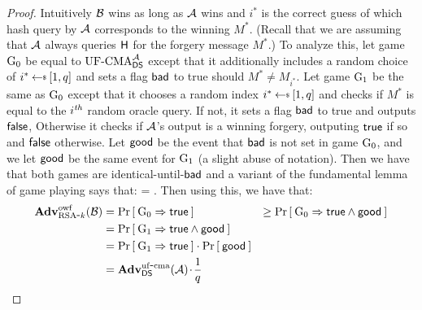 \begin{proof}
Intuitively ${\mathcal B}$ wins as long as ${\mathcal A}$ wins and $i^*$ is the correct guess
of which hash query by ${\mathcal A}$ corresponds to the winning $M^*$. (Recall that we
are assuming that ${\mathcal A}$ always queries $\mathsf{H}$ for the forgery message
$M^*$.) To analyze this, let game ${{\textnormal G}}_0$ be equal to $\textnormal{UF-CMA}_{{\mathsf{DS}}}^{\mathcal A}$ except
that it additionally includes a random choice of $i^* \getsr [1,q]$ and sets a
flag $\mathsf{bad}$ to true should $M^* \ne M_{i^*}$. Let
game ${{\textnormal G}}_1$ be the same as ${{\textnormal G}}_0$ except that  it chooses a random index $i^*
\getsr [1,q]$ and checks if $M^*$ is equal to the $i^{\textit{th}}$ random oracle
query. If not, it sets a flag $\mathsf{bad}$ to true and outputs $\mathsf{false}$, 
Otherwise it checks if ${\mathcal A}$'s output is a winning forgery, outputing
$\mathsf{true}$ if so and $\mathsf{false}$ otherwise. Let $\mathsf{good}$ be the event that $\mathsf{bad}$ is
not set in game ${{\textnormal G}}_0$, and we let $\mathsf{good}$ be the same event for ${{\textnormal G}}_1$ (a
slight abuse of notation). Then we have that both games are
identical-until-$\mathsf{bad}$ and a variant of the fundamental lemma of game playing
says that:
\bnm
  \Prob{\G_0 \Rightarrow\true \land\good} = \Prob{\G_1\Rightarrow\true \land
  \good} \;.
\enm
Then using this, we have that:
\begin{align*}
\mathbf{Adv}^{\mathrm{owf}}_{{\textnormal{RSA}\mbox{-} k}}({\mathcal B}) 
  &= \Pr\left[\: {{\textnormal G}}_0\Rightarrow\mathsf{true} \:\right]
  &\ge \Pr\left[\: {{\textnormal G}}_0\Rightarrow\mathsf{true}\land\mathsf{good} \:\right]\\
  &= \Pr\left[\: {{\textnormal G}}_1\Rightarrow\mathsf{true}\land\mathsf{good} \:\right]\\
  &= \Pr\left[\: {{\textnormal G}}_1\Rightarrow\mathsf{true} \:\right]\cdot\Pr\left[\: \mathsf{good} \:\right]\\
  &= \mathbf{Adv}^{\mathrm{uf\mbox{-} cma}}_{{\mathsf{DS}}}({\mathcal A}){\hspace{-0.1ex}}{\hspace{-0.1ex}}{\hspace{-0.1ex}}\cdot{\hspace{-0.1ex}}{\hspace{-0.1ex}}{\hspace{-0.1ex}}\frac{1}{q}
\end{align*}

\end{proof}


